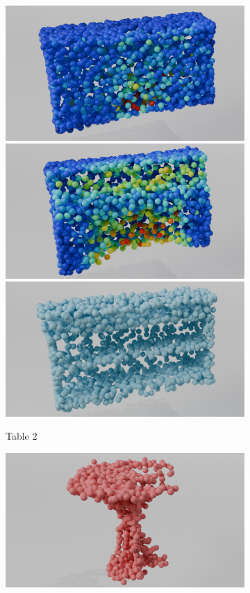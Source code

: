 \begin{figure}[htb]
\begin{subfigure}[t]{0.315\textwidth}
        \includegraphics[width=\textwidth]{figures/ens_lin_t2.png}
        \includegraphics[width=\textwidth]{figures/iml_lin_t2.png}
        \includegraphics[width=\textwidth]{figures/com_t2.png}
        \caption{Table 2}
    \end{subfigure}\hfill
    \begin{subfigure}[t]{0.315\textwidth}
        \includegraphics[width=\textwidth]{figures/part_t3.png}

\end{subfigure}
\end{figure}

